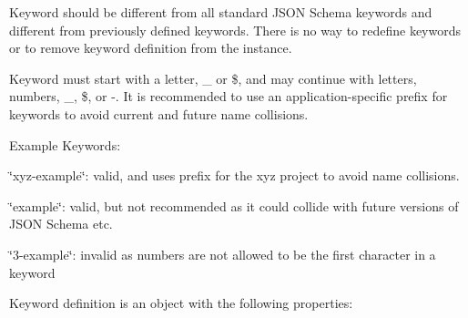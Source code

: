 Keyword should be different from all standard J\+S\+ON Schema keywords and different from previously defined keywords. There is no way to redefine keywords or to remove keyword definition from the instance.

Keyword must start with a letter, {\ttfamily \+\_\+} or {\ttfamily \$}, and may continue with letters, numbers, {\ttfamily \+\_\+}, {\ttfamily \$}, or {\ttfamily -\/}. It is recommended to use an application-\/specific prefix for keywords to avoid current and future name collisions.

Example Keywords\+:
\begin{DoxyItemize}
\item {\ttfamily \char`\"{}xyz-\/example\char`\"{}}\+: valid, and uses prefix for the xyz project to avoid name collisions.
\item {\ttfamily \char`\"{}example\char`\"{}}\+: valid, but not recommended as it could collide with future versions of J\+S\+ON Schema etc.
\item {\ttfamily \char`\"{}3-\/example\char`\"{}}\+: invalid as numbers are not allowed to be the first character in a keyword
\end{DoxyItemize}

Keyword definition is an object with the following properties\+:


